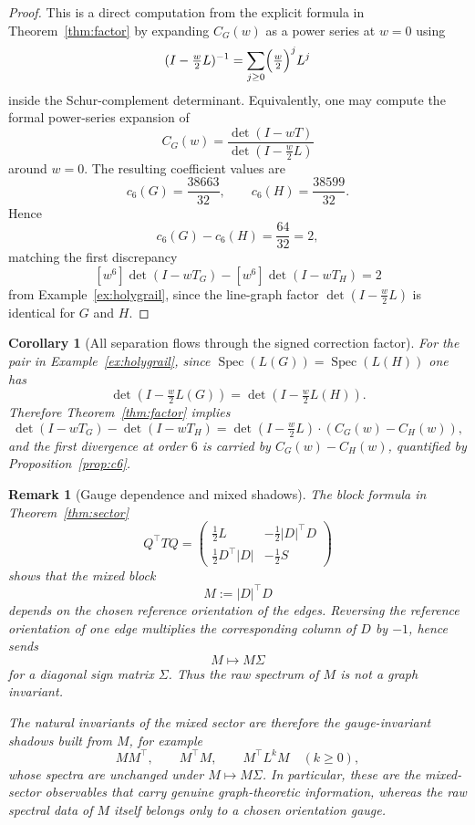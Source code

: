\documentclass[11pt]{article}
\newtheorem{corollary}{Corollary}
\newtheorem{remark}{Remark}
\begin{document}
\begin{proof}
This is a direct computation from the explicit formula in Theorem~\ref{thm:factor} by expanding $C_G(w)$ as a power series at $w=0$ using
\[
(I-\tfrac w2 L)^{-1}=\sum_{j\ge0}\Bigl(\tfrac w2\Bigr)^j L^j
\]
inside the Schur-complement determinant. Equivalently, one may compute the formal power-series expansion of
\[
C_G(w)=\frac{\det(I-wT)}{\det(I-\tfrac w2 L)}
\]
around $w=0$. The resulting coefficient values are
\[
c_6(G)=\frac{38663}{32},\qquad c_6(H)=\frac{38599}{32}.
\]
Hence
\[
c_6(G)-c_6(H)=\frac{64}{32}=2,
\]
matching the first discrepancy
\[
[w^6]\det(I-wT_G)-[w^6]\det(I-wT_H)=2
\]
from Example~\ref{ex:holygrail}, since the line-graph factor $\det(I-\tfrac w2 L)$ is identical for $G$ and $H$.
\end{proof}

\begin{corollary}[All separation flows through the signed correction factor]\label{cor:allthroughC}
For the pair in Example~\ref{ex:holygrail}, since $\operatorname{Spec}(L(G))=\operatorname{Spec}(L(H))$ one has
\[
\det(I-\tfrac w2 L(G))=\det(I-\tfrac w2 L(H)).
\]
Therefore Theorem~\ref{thm:factor} implies
\[
\det(I-wT_G)-\det(I-wT_H)=\det(I-\tfrac w2 L)\cdot(C_G(w)-C_H(w)),
\]
and the first divergence at order $6$ is carried by $C_G(w)-C_H(w)$, quantified by Proposition~\ref{prop:c6}.
\end{corollary}

\begin{remark}[Gauge dependence and mixed shadows]
The block formula in Theorem~\ref{thm:sector}
\[
Q^\top TQ=
\begin{pmatrix}
\frac12 L & -\frac12 |D|^\top D\\[2pt]
\frac12 D^\top |D| & -\frac12 S
\end{pmatrix}
\]
shows that the mixed block
\[
M:=|D|^\top D
\]
depends on the chosen reference orientation of the edges. Reversing the reference orientation of one edge multiplies the corresponding column of \(D\) by \(-1\), hence sends
\[
M \longmapsto M\Sigma
\]
for a diagonal sign matrix \(\Sigma\). Thus the raw spectrum of \(M\) is not a graph invariant.

The natural invariants of the mixed sector are therefore the gauge-invariant shadows built from \(M\), for example
\[
MM^\top,\qquad M^\top M,\qquad M^\top L^k M \quad (k\ge 0),
\]
whose spectra are unchanged under \(M\mapsto M\Sigma\). In particular, these are the mixed-sector observables that carry genuine graph-theoretic information, whereas the raw spectral data of \(M\) itself belongs only to a chosen orientation gauge.
\end{remark}
\end{document}
